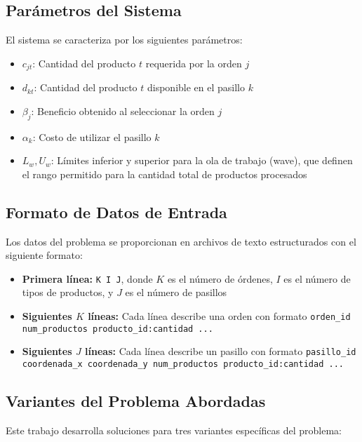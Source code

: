 \documentclass[a4paper,12pt]{article}
\begin{document}
\subsection{Parámetros del Sistema}

El sistema se caracteriza por los siguientes parámetros:

\begin{itemize}
    \item $c_{jt}$: Cantidad del producto $t$ requerida por la orden $j$
    \item $d_{kt}$: Cantidad del producto $t$ disponible en el pasillo $k$
    \item $\beta_j$: Beneficio obtenido al seleccionar la orden $j$
    \item $\alpha_k$: Costo de utilizar el pasillo $k$
    \item $L_w, U_w$: Límites inferior y superior para la ola de trabajo (wave), que definen el rango permitido para la cantidad total de productos procesados
\end{itemize}

\subsection{Formato de Datos de Entrada}

Los datos del problema se proporcionan en archivos de texto estructurados con el siguiente formato:

\begin{itemize}
    \item \textbf{Primera línea:} \texttt{K I J}, donde $K$ es el número de órdenes, $I$ es el número de tipos de productos, y $J$ es el número de pasillos
    \item \textbf{Siguientes $K$ líneas:} Cada línea describe una orden con formato \texttt{orden\_id num\_productos producto\_id:cantidad ...}
    \item \textbf{Siguientes $J$ líneas:} Cada línea describe un pasillo con formato \texttt{pasillo\_id coordenada\_x coordenada\_y num\_productos producto\_id:cantidad ...}
\end{itemize}

\subsection{Variantes del Problema Abordadas}

Este trabajo desarrolla soluciones para tres variantes específicas del problema:
\end{document}
